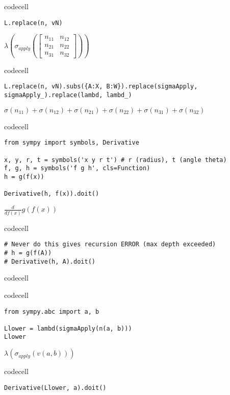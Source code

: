 codecell

\begin{verbatim}
L.replace(n, vN)
\end{verbatim}

$\displaystyle \lambda{\left(\sigma_{apply}{\left(\left[\begin{matrix}n_{11} & n_{12}\\n_{21} & n_{22}\\n_{31} & n_{32}\end{matrix}\right] \right)} \right)}$

codecell

\begin{verbatim}
L.replace(n, vN).subs({A:X, B:W}).replace(sigmaApply, sigmaApply_).replace(lambd, lambd_)
\end{verbatim}

$\displaystyle \sigma{\left(n_{11} \right)} + \sigma{\left(n_{12} \right)} + \sigma{\left(n_{21} \right)} + \sigma{\left(n_{22} \right)} + \sigma{\left(n_{31} \right)} + \sigma{\left(n_{32} \right)}$

codecell

\begin{verbatim}
from sympy import symbols, Derivative

x, y, r, t = symbols('x y r t') # r (radius), t (angle theta)
f, g, h = symbols('f g h', cls=Function)
h = g(f(x))

Derivative(h, f(x)).doit()
\end{verbatim}

$\displaystyle \frac{d}{d f{\left(x \right)}} g{\left(f{\left(x \right)} \right)}$

codecell

\begin{verbatim}
# Never do this gives recursion ERROR (max depth exceeded)
# h = g(f(A))
# Derivative(h, A).doit()
\end{verbatim}


codecell


codecell

\begin{verbatim}
from sympy.abc import a, b

Llower = lambd(sigmaApply(n(a, b)))
Llower
\end{verbatim}

$\displaystyle \lambda{\left(\sigma_{apply}{\left(v{\left(a,b \right)} \right)} \right)}$

codecell

\begin{verbatim}
Derivative(Llower, a).doit()
\end{verbatim}

